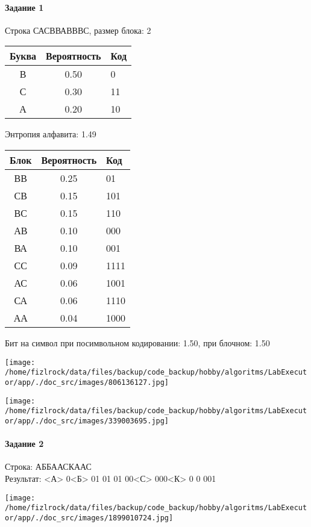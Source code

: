 \documentclass[a4paper, 12pt]{article}
\begin{document}
\paragraph{Задание 1}

Строка САСВВАВВВС, размер блока: 2
\begin{center}
 \begin{tabular}{ |c|c|l| } 
  \hline
     Буква & Вероятность & Код\\ \hline
В & 0.50 & 0\\\hline
С & 0.30 & 11\\\hline
А & 0.20 & 10
\\ \hline \end{tabular}
\end{center}
Энтропия алфавита: 1.49
\begin{center}
 \begin{tabular}{ |c|c|l| } 
  \hline
     Блок & Вероятность & Код\\ \hline
ВВ & 0.25 & 01\\\hline
СВ & 0.15 & 101\\\hline
ВС & 0.15 & 110\\\hline
АВ & 0.10 & 000\\\hline
ВА & 0.10 & 001\\\hline
СС & 0.09 & 1111\\\hline
АС & 0.06 & 1001\\\hline
СА & 0.06 & 1110\\\hline
АА & 0.04 & 1000
\\ \hline \end{tabular}
\end{center}
Бит на символ при посимвольном кодировании: 1.50, при блочном: 1.50

\texttt{[image: /home/fizlrock/data/files/backup/code\_backup/hobby/algoritms/LabExecutor/app/./doc\_src/images/806136127.jpg]}

\texttt{[image: /home/fizlrock/data/files/backup/code\_backup/hobby/algoritms/LabExecutor/app/./doc\_src/images/339003695.jpg]}
\pagebreak
\paragraph{Задание 2}

Строка: 
АББААСКААС\\
Результат: <А> 0<Б> 01 01 01 00<С> 000<К> 0 0 001

\texttt{[image: /home/fizlrock/data/files/backup/code\_backup/hobby/algoritms/LabExecutor/app/./doc\_src/images/1899010724.jpg]}
\end{document}
